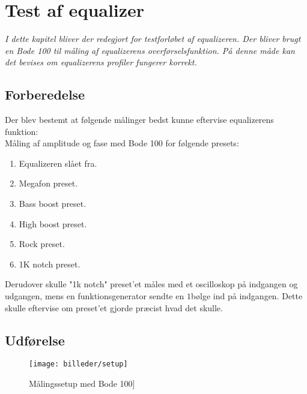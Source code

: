 \chapter{Test af equalizer}\label{sec:test_eq}

\emph{I dette kapitel bliver der redegjort for testforløbet af equalizeren. Der bliver brugt en Bode 100 til måling af equalizerens overførselsfunktion. På denne måde kan det bevises om equalizerens profiler fungerer korrekt.}

\section{Forberedelse}
Der blev bestemt at følgende målinger bedst kunne eftervise equalizerens funktion: \\

Måling af amplitude og fase med Bode 100 for følgende presets:
\begin{enumerate}
    \item Equalizeren slået fra.
    \item Megafon preset.
    \item Bass boost preset.
    \item High boost preset.
    \item Rock preset. 
    \item 1K notch preset. \\
\end{enumerate}


Derudover skulle "1k notch" preset'et måles med et oscilloskop på indgangen og udgangen, mens en funktionsgenerator sendte en $1$\kilo\hertz bølge ind på indgangen. Dette skulle eftervise om preset'et gjorde præcist hvad det skulle. \\

\section{Udførelse}
\begin{figure}[h!]
	\centering
	\texttt{[image: billeder/setup]}
	\caption{Målingssetup med Bode 100]}
	\label{fig:bode100}
\end{figure}